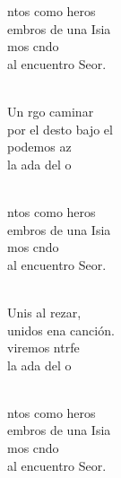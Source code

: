 \documentclass[12pt]{article}
\begin{document}
\begin{multicols*}{2}
\begin{cancion}%
	\begin{chorus}%
	ntos como heros\\
	embros de una Isia\\
	mos cndo\\
	al encuentro  Seor.\\
	\end{chorus}%
	\jump\\
	Un rgo caminar\\
	por el desto bajo el \\
	 podemos az\\
	 la ada del o \\\jump\\
	\begin{chorus}%
	ntos como heros\\
	embros de una Isia\\
	mos cndo\\
	al encuentro  Seor.\\
	\end{chorus}%
	\jump\\
	Unis al rezar,\\
	unidos ena canción. \\
	viremos ntrfe\\
	 la ada del o \\\jump\\
	\begin{chorus}%
	ntos como heros\\
	embros de una Isia\\
	mos cndo\\
	al encuentro  Seor.\\
	\end{chorus}%
	\jump\\

\end{cancion}
\end{multicols*}
\end{document}
